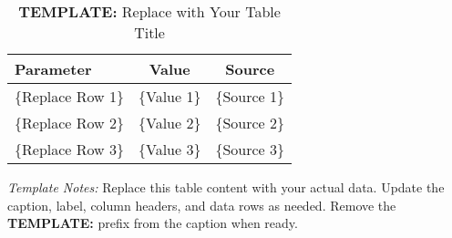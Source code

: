 \documentclass{econsocart}
\begin{document}

\begin{table}[h]
  \centering
  \caption{{\bf TEMPLATE:} Replace with Your Table Title\label{tab:template}}
  \begin{tabular}{lcc}
    \hline
    \textbf{Parameter} & \textbf{Value} & \textbf{Source} \\
    \hline
    \{Replace Row 1\}  & \{Value 1\}    & \{Source 1\}    \\
    \{Replace Row 2\}  & \{Value 2\}    & \{Source 2\}    \\
    \{Replace Row 3\}  & \{Value 3\}    & \{Source 3\}    \\
    \hline
  \end{tabular}
  \begin{flushleft}
    \footnotesize
    \textit{Template Notes:} Replace this table content with your actual data.
    Update the caption, label, column headers, and data rows as needed.
    Remove the {\bf TEMPLATE:} prefix from the caption when ready.
  \end{flushleft}
\end{table}

\end{document}
